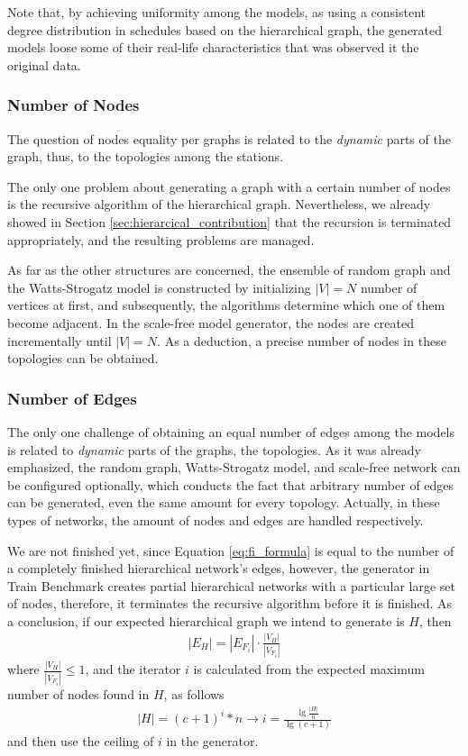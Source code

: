 Note that, by achieving uniformity among the models, as using a consistent degree distribution in schedules based on the hierarchical graph, the generated models loose some of their real-life characteristics that was observed it the original data.

\subsubsection{Number of Nodes}

The question of nodes equality per graphs is related to the \textit{dynamic} parts of the graph, thus, to the topologies among the stations.

The only one problem about generating a graph with a certain number of nodes is the recursive algorithm of the hierarchical graph. Nevertheless, we already showed in Section \ref{sec:hierarcical_contribution} that the recursion is terminated appropriately, and the resulting problems are managed.

As far as the other structures are concerned, the ensemble of random graph and the Watts-Strogatz model is constructed by initializing $|V| = N$ number of vertices at first, and subsequently, the algorithms determine which one of them become adjacent. In the scale-free model generator, the nodes are created incrementally until $|V| = N$. As a deduction, a precise number of nodes in these topologies can be obtained.

\subsubsection{Number of Edges}

The only one challenge of obtaining an equal number of edges among the models is related to \textit{dynamic} parts of the graphs, the topologies. As it was already emphasized, the random graph, Watts-Strogatz model, and scale-free network can be configured optionally, which conducts the fact that arbitrary number of edges can be generated, even the same amount for every topology. Actually, in these types of networks, the amount of nodes and edges are handled respectively.


We are not finished yet, since Equation \ref{eq:fi_formula} is equal to the number of a completely finished hierarchical network's edges, however, the generator in Train Benchmark creates partial hierarchical networks with a particular large set of nodes, therefore, it terminates the recursive algorithm before it is finished. As a conclusion, if our expected hierarchical graph we intend to generate is $H$, then
\begin{align}
	|E_H| = |E_{F_i}| \cdot \frac{|V_H|}{|V_{F_i}|}
\end{align}
where $\frac{|V_H|}{|V_{F_i}|} \leq 1$, and the iterator $i$ is calculated from the expected maximum number of nodes found in $H$, as follows
\begin{align}
	|H| = (c+1)^i * n  \longrightarrow  i = \frac{\lg\frac{|H|}{n}}{\lg(c+1)}
\end{align}
and then use the ceiling of $i$ in the generator.
